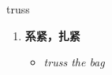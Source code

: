 
\begin{frame}
{\huge truss}
\begin{center}
\begin{enumerate}\Large
  \item \textbf{系紧，扎紧}
  \begin{itemize}
    \item \em{\Large{truss the bag}}
  \end{itemize}
\end{enumerate}
\end{center}
\end{frame}
